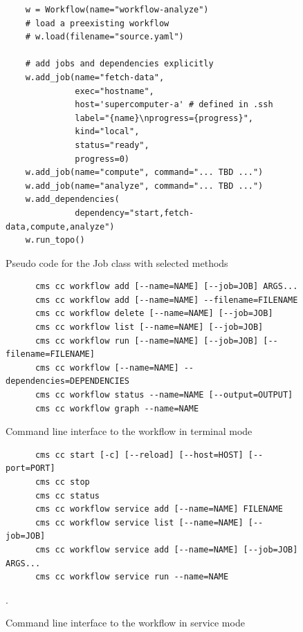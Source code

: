 \begin{figure}[htb]
\begin{verbatim}
    w = Workflow(name="workflow-analyze")
    # load a preexisting workflow
    # w.load(filename="source.yaml")
    
    # add jobs and dependencies explicitly
    w.add_job(name="fetch-data",
              exec="hostname",
              host='supercomputer-a' # defined in .ssh
              label="{name}\nprogress={progress}",
              kind="local",
              status="ready",
              progress=0)
    w.add_job(name="compute", command="... TBD ...")
    w.add_job(name="analyze", command="... TBD ...")
    w.add_dependencies(
              dependency="start,fetch-data,compute,analyze")
    w.run_topo()
\end{verbatim}
\caption{Pseudo code for the Job class with selected methods}
\label{fig:code-workflow-example}

\bigskip

\begin{verbatim}
      cms cc workflow add [--name=NAME] [--job=JOB] ARGS...
      cms cc workflow add [--name=NAME] --filename=FILENAME
      cms cc workflow delete [--name=NAME] [--job=JOB]
      cms cc workflow list [--name=NAME] [--job=JOB]
      cms cc workflow run [--name=NAME] [--job=JOB] [--filename=FILENAME]
      cms cc workflow [--name=NAME] --dependencies=DEPENDENCIES
      cms cc workflow status --name=NAME [--output=OUTPUT]
      cms cc workflow graph --name=NAME
\end{verbatim}
\caption{Command line interface to the workflow in terminal mode}
\label{fig:code-workflow-commandline}

\bigskip

\begin{verbatim}
      cms cc start [-c] [--reload] [--host=HOST] [--port=PORT]
      cms cc stop
      cms cc status
      cms cc workflow service add [--name=NAME] FILENAME
      cms cc workflow service list [--name=NAME] [--job=JOB]
      cms cc workflow service add [--name=NAME] [--job=JOB] ARGS...
      cms cc workflow service run --name=NAME
\end{verbatim}
\caption{Command line interface to the workflow in service mode}
\label{fig:code-workflow-service-commandline}.



\end{figure}
